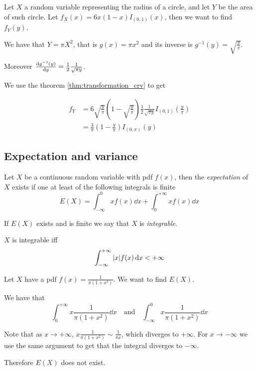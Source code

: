 \documentclass[12pt]{extarticle}
\begin{document}
\begin{example}
    Let $X$ a random variable representing the radius of a circle, and let $Y$ be the area of such circle.
    Let $f_X(x) = 6x(1-x)I_{(0,1)}(x)$, then we want to find $f_Y(y)$.

    We have that $Y = \pi X^2$, that is $g(x) = \pi x^2$ and its inverse is $g^{-1}(y) = \sqrt{\frac{y}{\pi}}$.

    Moreover $\dv{g^{-1}(y)}{y} = \frac{1}{2} \frac{1}{\sqrt{\pi y}}$.

    We use the theorem \ref{thm:transformation_crv} to get

    \begin{align}
        f_Y & = 6\sqrt{\frac{y}{\pi}} \left(1- \sqrt{\frac{y}{\pi}}\right) \frac{1}{2} \frac{1}{\sqrt{\pi y}} I_{(0, 1)}\left(\frac{y}{\pi}\right) \\
            & = \frac{3}{\pi} \left(1- \frac{y}{\pi}\right) I_{(0, \pi)}(y)
    \end{align}

\end{example}

\subsection{Expectation and variance}

\begin{definition}[expectation]
    Let $X$ be a continuous random variable with pdf $f(x)$, then the \emph{expectation} of $X$ exists if one at least of the following integrals is finite
    \begin{equation}
        E(X) = \int_{-\infty}^{0} x f(x) \dd{x} + \int_{0}^{+\infty} x f(x) \dd{x}
    \end{equation}

    If $E(X)$ exists and is finite we say that $X$ is \emph{integrable}.
\end{definition}

\begin{lemma}
    $X$ is integrable iff
    \begin{equation}
        \int_{-\infty}^{+\infty} \abs{x} f(x) \dd{x} < +\infty
    \end{equation}
\end{lemma}

\begin{example}
    Let $X$ have a pdf $f(x) = \frac{1}{\pi (1+x^2)}$.
    We want to find $E(X)$.

    We have that
    \begin{equation}
        \int_0^{+\infty} x \frac{1}{\pi (1+x^2)} \dd{x} \quad \text{and} \quad \int_{-\infty}^0 x \frac{1}{\pi (1+x^2)} \dd{x}
    \end{equation}

    Note that as $x \to +\infty$, $x \frac{1}{\pi (1+x^2)} \sim \frac{1}{\pi x}$, which diverges to $+\infty$.
    For $x \to -\infty$ we use the same argument to get that the integral diverges to $-\infty$.

    Therefore $E(X)$ does not exist.
\end{example}
\end{document}

